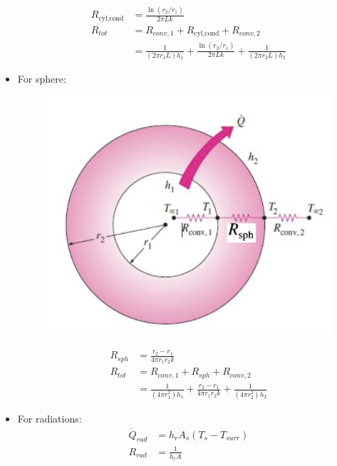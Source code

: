 \begin{itemize}
\begin{figure}[H]
    \end{figure}
    \begin{align*}
        R_{\text{cyl,cond}} &= \frac{\ln(r_2/r_1)}{2\pi L k} \\
        R_{tot} &= R_{conv,1}+R_{\text{cyl,cond}} + R_{conv,2} \\
        &= \frac{1}{(2\pi r_1 L)h_1} + \frac{\ln(r_2/r_1)}{2\pi L k} + \frac{1}{(2\pi r_2 L)h_2}
    \end{align*}
    \item For \color{red} sphere: \color{black}
    \begin{figure}[H]
        \centering
        \includegraphics[width=0.9\linewidth]{images/thermal_resistance_sphere.png}
    \end{figure}
    \begin{align*}
        R_{sph} &= \frac{r_2 - r_1}{4\pi r_1 r_2 k} \\
        R_{tot} &= R_{conv,1} + R_{sph} + R_{conv,2} \\
        &= \frac{1}{(4\pi r_1^2)h_1} + \frac{r_2 - r_1}{4\pi r_1 r_2 k} + \frac{1}{(4\pi r_2^2)h_2}
    \end{align*}
    \item For \color{red} radiations: \color{black}
    \begin{align*}
        \dot{Q}_{rad} &= h_r A_s (T_s - T_{surr}) \\
        R_{rad} &= \frac{1}{h_r A}
    \end{align*}
\end{itemize}


